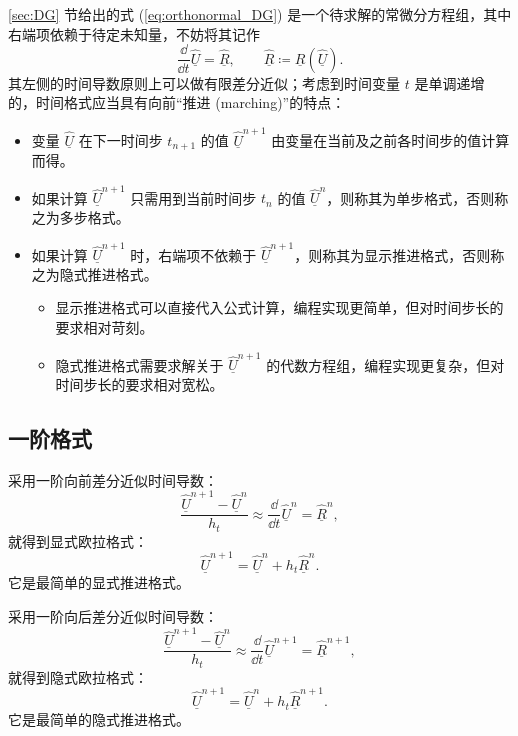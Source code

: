 \ref{sec:DG} 节给出的式 (\ref{eq:orthonormal_DG}) 是一个待求解的常微分方程组，其中右端项依赖于待定未知量，不妨将其记作
\begin{equation}
\frac{\dd}{\dd t}\underline{\hat{U}}=\underline{\hat{R}},\qquad\underline{\hat{R}}\coloneqq\underline{R}(\underline{\hat{U}}).
\end{equation}
其左侧的时间导数原则上可以做有限差分近似；考虑到时间变量 $t$ 是单调递增的，时间格式应当具有向前“推进 (marching)”的特点：
\begin{itemize}
\item 变量 $\underline{\hat{U}}$ 在下一时间步 $t_{n+1}$ 的值 $\underline{\hat{U}}^{n+1}$
由变量在当前及之前各时间步的值计算而得。
\item 如果计算 $\underline{\hat{U}}^{n+1}$ 只需用到当前时间步 $t_{n}$ 的值 $\underline{\hat{U}}^{n}$，则称其为单步格式，否则称之为多步格式。
\item 如果计算 $\underline{\hat{U}}^{n+1}$ 时，右端项不依赖于 $\underline{\hat{U}}^{n+1}$，则称其为显示推进格式，否则称之为隐式推进格式。
\begin{itemize}
\item 显示推进格式可以直接代入公式计算，编程实现更简单，但对时间步长的要求相对苛刻。
\item 隐式推进格式需要求解关于 $\underline{\hat{U}}^{n+1}$ 的代数方程组，编程实现更复杂，但对时间步长的要求相对宽松。
\end{itemize}
\end{itemize}

\subsection{一阶格式}

采用一阶向前差分近似时间导数：
\begin{equation}
\frac{\underline{\hat{U}}^{n+1}-\underline{\hat{U}}^{n}}{h_{t}}\approx\frac{\dd}{\dd t}\underline{\hat{U}}^{n}=\underline{\hat{R}}^{n},
\end{equation}
就得到显式欧拉格式：
\begin{equation}
\underline{\hat{U}}^{n+1}=\underline{\hat{U}}^{n}+h_{t}\underline{\hat{R}}^{n}.\label{eq:Euler}
\end{equation}
它是最简单的显式推进格式。

采用一阶向后差分近似时间导数：
\begin{equation}
\frac{\underline{\hat{U}}^{n+1}-\underline{\hat{U}}^{n}}{h_{t}}\approx\frac{\dd}{\dd t}\underline{\hat{U}}^{n+1}=\underline{\hat{R}}^{n+1},
\end{equation}
就得到隐式欧拉格式：
\begin{equation}
\underline{\hat{U}}^{n+1}=\underline{\hat{U}}^{n}+h_{t}\underline{\hat{R}}^{n+1}.
\end{equation}
它是最简单的隐式推进格式。

